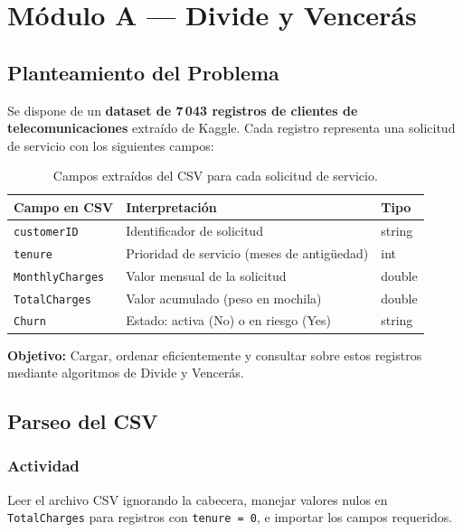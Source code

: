 \documentclass[12pt, a4paper]{article}
\begin{document}
\section{Módulo A — Divide y Vencerás}

\subsection{Planteamiento del Problema}

Se dispone de un \textbf{dataset de 7\,043 registros de clientes de telecomunicaciones} extraído de Kaggle. Cada registro representa una solicitud de servicio con los siguientes campos:

\begin{table}[h!]
\centering
\small
\begin{tabularx}{\textwidth}{lll}
\toprule
\textbf{Campo en CSV} & \textbf{Interpretación} & \textbf{Tipo} \\
\midrule
\texttt{customerID} & Identificador de solicitud & string \\
\texttt{tenure} & Prioridad de servicio (meses de antigüedad) & int \\
\texttt{MonthlyCharges} & Valor mensual de la solicitud & double \\
\texttt{TotalCharges} & Valor acumulado (peso en mochila) & double \\
\texttt{Churn} & Estado: activa (No) o en riesgo (Yes) & string \\
\bottomrule
\end{tabularx}
\caption{Campos extraídos del CSV para cada solicitud de servicio.}
\end{table}

\textbf{Objetivo:} Cargar, ordenar eficientemente y consultar sobre estos registros mediante algoritmos de Divide y Vencerás.

\subsection{Parseo del CSV}

\subsubsection*{Actividad}

Leer el archivo CSV ignorando la cabecera, manejar valores nulos en \texttt{TotalCharges} para registros con \texttt{tenure = 0}, e importar los campos requeridos.
\end{document}
